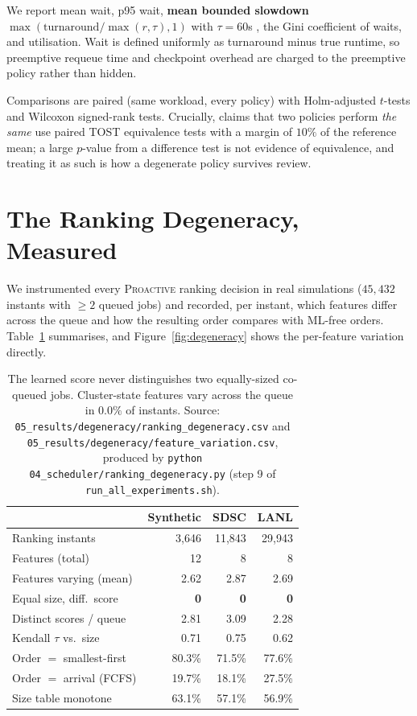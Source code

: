\documentclass[11pt,twocolumn]{article}
\begin{document}
We report mean wait, p95 wait, \textbf{mean bounded slowdown}
$\max(\text{turnaround}/\max(r, \tau), 1)$ with $\tau = 60$s
\cite{Feitelson2000}, the Gini coefficient of waits, and utilisation. Wait is
defined uniformly as turnaround minus true runtime, so preemptive requeue time
and checkpoint overhead are charged to the preemptive policy rather than hidden.

Comparisons are paired (same workload, every policy) with Holm-adjusted
$t$-tests and Wilcoxon signed-rank tests. Crucially, claims that two policies
perform \emph{the same} use paired TOST equivalence tests with a margin of
$10\%$ of the reference mean; a large $p$-value from a difference test is not
evidence of equivalence, and treating it as such is how a degenerate policy
survives review.

\section{The Ranking Degeneracy, Measured}
\label{sec:degeneracy}

We instrumented every \textsc{Proactive} ranking decision in real simulations
($45{,}432$ instants with $\ge 2$ queued jobs) and recorded, per instant, which
features differ across the queue and how the resulting order compares with
ML-free orders. Table~\ref{tab:degeneracy} summarises, and
Figure~\ref{fig:degeneracy} shows the per-feature variation directly.

\begin{table}[h]
\centering
\footnotesize
\begin{tabular}{lrrr}
\toprule
 & Synthetic & SDSC & LANL \\
\midrule
Ranking instants        & 3{,}646 & 11{,}843 & 29{,}943 \\
Features (total)        & 12 & 8 & 8 \\
Features varying (mean) & 2.62 & 2.87 & 2.69 \\
Equal size, diff.\ score & \textbf{0} & \textbf{0} & \textbf{0} \\
Distinct scores / queue & 2.81 & 3.09 & 2.28 \\
Kendall $\tau$ vs.\ size & 0.71 & 0.75 & 0.62 \\
Order $=$ smallest-first & 80.3\% & 71.5\% & 77.6\% \\
Order $=$ arrival (FCFS) & 19.7\% & 18.1\% & 27.5\% \\
Size table monotone     & 63.1\% & 57.1\% & 56.9\% \\
\bottomrule
\end{tabular}
\caption{The learned score never distinguishes two equally-sized co-queued jobs.
Cluster-state features vary across the queue in $0.0\%$ of instants.
{\small Source: \texttt{05\_results/degeneracy/ranking\_degeneracy.csv} and
\texttt{05\_results/degeneracy/feature\_variation.csv}, produced by
\texttt{python 04\_scheduler/ranking\_degeneracy.py} (step 9 of
\texttt{run\_all\_experiments.sh}).}}
\label{tab:degeneracy}
\end{table}
\end{document}
